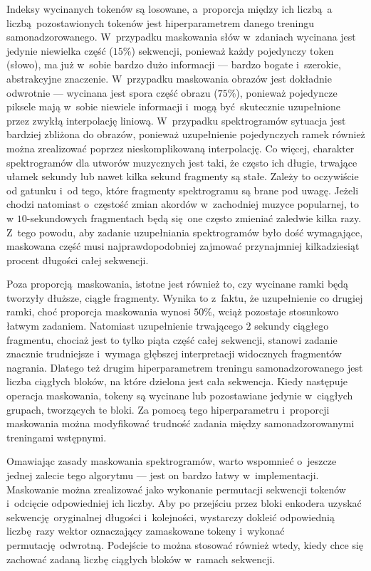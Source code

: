 Indeksy wycinanych tokenów są losowane, a~proporcja między ich liczbą a liczbą pozostawionych tokenów jest hiperparametrem danego treningu samonadzorowanego. W~przypadku maskowania słów w~zdaniach \cite{devlin_bert_2019} wycinana jest jedynie niewielka część ($15\%$) sekwencji, ponieważ każdy pojedynczy token (słowo), ma już w~sobie bardzo dużo informacji --- bardzo bogate i~szerokie, abstrakcyjne znaczenie. W~przypadku maskowania obrazów \cite{he_masked_2021} jest dokładnie odwrotnie --- wycinana jest spora część obrazu ($75\%$), ponieważ pojedyncze piksele mają w~sobie niewiele informacji i~mogą być skutecznie uzupełnione przez zwykłą interpolację liniową. W~przypadku spektrogramów sytuacja jest bardziej zbliżona do obrazów, ponieważ uzupełnienie pojedynczych ramek również można zrealizować poprzez nieskomplikowaną interpolację. Co więcej, charakter spektrogramów dla utworów muzycznych jest taki, że często ich długie, trwające ułamek sekundy lub nawet kilka sekund fragmenty są stałe. Zależy to oczywiście od gatunku i~od tego, które fragmenty spektrogramu są brane pod uwagę. Jeżeli chodzi natomiast o~częstość zmian akordów w~zachodniej muzyce popularnej, to w $10$-sekundowych fragmentach będą się one często zmieniać zaledwie kilka razy. Z~tego powodu, aby zadanie uzupełniania spektrogramów było dość wymagające, maskowana część musi najprawdopodobniej zajmować przynajmniej kilkadziesiąt procent długości całej sekwencji.

Poza proporcją maskowania, istotne jest również to, czy wycinane ramki będą tworzyły dłuższe, ciągłe fragmenty. Wynika to z~faktu, że uzupełnienie co drugiej ramki, choć proporcja maskowania wynosi $50\%$, wciąż pozostaje stosunkowo łatwym zadaniem. Natomiast uzupełnienie trwającego $2$ sekundy ciągłego fragmentu, chociaż jest to tylko piąta część całej sekwencji, stanowi zadanie znacznie trudniejsze i~wymaga głębszej interpretacji widocznych fragmentów nagrania. Dlatego też drugim hiperparametrem treningu samonadzorowanego jest liczba ciągłych bloków, na które dzielona jest cała sekwencja. Kiedy następuje operacja maskowania, tokeny są wycinane lub pozostawiane jedynie w~ciągłych grupach, tworzących te bloki. Za pomocą tego hiperparametru i~proporcji maskowania można modyfikować trudność zadania między samonadzorowanymi treningami wstępnymi.

Omawiając zasady maskowania spektrogramów, warto wspomnieć o~jeszcze jednej zalecie tego algorytmu --- jest on bardzo łatwy w~implementacji. Maskowanie można zrealizować jako wykonanie permutacji sekwencji tokenów i~odcięcie odpowiedniej ich liczby. Aby po przejściu przez bloki enkodera uzyskać sekwencję oryginalnej długości i~kolejności, wystarczy dokleić odpowiednią liczbę razy wektor oznaczający zamaskowane tokeny i~wykonać permutację odwrotną. Podejście to można stosować również wtedy, kiedy chce się zachować zadaną liczbę ciągłych bloków w~ramach sekwencji.

